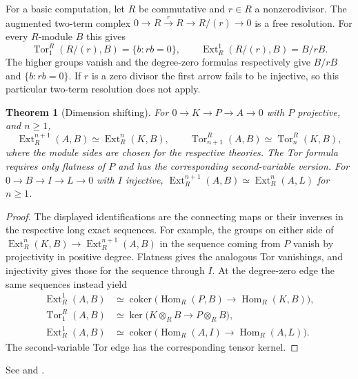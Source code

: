 \documentclass[11pt,oneside,openany]{book}
\newtheorem{theorem}{Theorem}[chapter]
\theoremstyle{definition}
\theoremstyle{remark}
\begin{document}
For a basic computation, let \(R\) be commutative and \(r\in R\)
a nonzerodivisor. The augmented two-term complex
\(0\to R\xrightarrow{r}R\to R/(r)\to0\) is a free resolution.
For every \(R\)-module \(B\) this gives
\[
 \operatorname{Tor}_1^R(R/(r),B)=\{b:rb=0\},\qquad
 \operatorname{Ext}^1_R(R/(r),B)=B/rB .
\]
The higher groups vanish and the degree-zero formulas respectively
give \(B/rB\) and \(\{b:rb=0\}\). If \(r\) is a zero divisor
the first arrow fails to be injective, so this particular
two-term resolution does not apply.

\begin{theorem}[Dimension shifting]
\label{p103:ALG-10-C02-R04}
For \(0\to K\to P\to A\to0\) with \(P\) projective, and \(n\geq1\),
\[
 \operatorname{Ext}^{n+1}_R(A,B)\simeq\operatorname{Ext}^n_R(K,B),
 \qquad
 \operatorname{Tor}_{n+1}^R(A,B)\simeq\operatorname{Tor}_n^R(K,B),
\]
where the module sides are chosen for the respective theories.
The Tor formula requires only flatness of \(P\) and has the
corresponding second-variable version. For \(0\to B\to I\to L\to0\)
with \(I\) injective,
\(\operatorname{Ext}^{n+1}_R(A,B)\simeq\operatorname{Ext}^n_R(A,L)\)
for \(n\geq1\).
\end{theorem}

\begin{proof}
The displayed identifications are the connecting maps or their
inverses in the respective long exact sequences. For example,
the groups on either side of
\(\operatorname{Ext}^n_R(K,B)\to\operatorname{Ext}^{n+1}_R(A,B)\)
in the sequence coming from \(P\) vanish by projectivity in
positive degree. Flatness gives the analogous Tor vanishings,
and injectivity gives those for the sequence through \(I\).
At the degree-zero edge the same sequences instead yield
\[
 \begin{aligned}
 \operatorname{Ext}^1_R(A,B)
   &\simeq \operatorname{coker}
   \bigl(\operatorname{Hom}_R(P,B)\to\operatorname{Hom}_R(K,B)\bigr),\\
 \operatorname{Tor}_1^R(A,B)
   &\simeq \ker\bigl(K\otimes_R B\to P\otimes_R B\bigr),\\
 \operatorname{Ext}^1_R(A,B)
   &\simeq \operatorname{coker}
   \bigl(\operatorname{Hom}_R(A,I)\to\operatorname{Hom}_R(A,L)\bigr).
 \end{aligned}
\]
The second-variable Tor edge has the corresponding tensor kernel.
\end{proof}

See \cite[Exercise 2.4.3 and \S2.5]{weibel} and
\cite[\S6.2]{rotman}.
\end{document}
